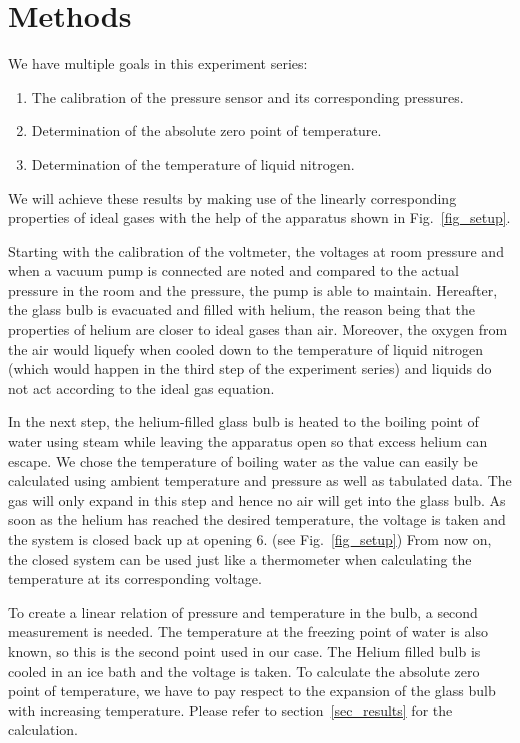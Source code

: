 \section{Methods}



    We have multiple goals in this experiment series:
    \begin{enumerate}
        \item The calibration of the pressure sensor and its corresponding pressures.
        \item Determination of the absolute zero point of temperature.
        \item Determination of the temperature of liquid nitrogen.
    \end{enumerate}
    We will achieve these results by making use of the linearly corresponding properties of ideal gases with the help of the apparatus shown in Fig.~\ref{fig_setup}.

    

    Starting with the calibration of the voltmeter, the voltages at room pressure and when a vacuum pump is connected are noted and compared to the actual pressure in the room and the pressure, the pump is able to maintain.
    Hereafter, the glass bulb is evacuated and filled with helium, the reason being that the properties of helium are closer to ideal gases than air.
    Moreover, the oxygen from the air would liquefy when cooled down to the temperature of liquid nitrogen (which would happen in the third step of the experiment series) and liquids do not act according to the ideal gas equation.

    In the next step, the helium-filled glass bulb is heated to the boiling point of water using steam while leaving the apparatus open so that excess helium can escape.
    We chose the temperature of boiling water as the value can easily be calculated using ambient temperature and pressure as well as tabulated data.
    The gas will only expand in this step and hence no air will get into the glass bulb.
    As soon as the helium has reached the desired temperature, the voltage is taken and the system is closed back up at opening 6. (see Fig.~\ref{fig_setup})
    From now on, the closed system can be used just like a thermometer when calculating the temperature at its corresponding voltage.
    
    To create a linear relation of pressure and temperature in the bulb, a second measurement is needed.
    The temperature at the freezing point of water is also known, so this is the second point used in our case.
    The Helium filled bulb is cooled in an ice bath and the voltage is taken.
    To calculate the absolute zero point of temperature, we have to pay respect to the expansion of the glass bulb with increasing temperature.
    Please refer to section~\ref{sec_results} for the calculation.

